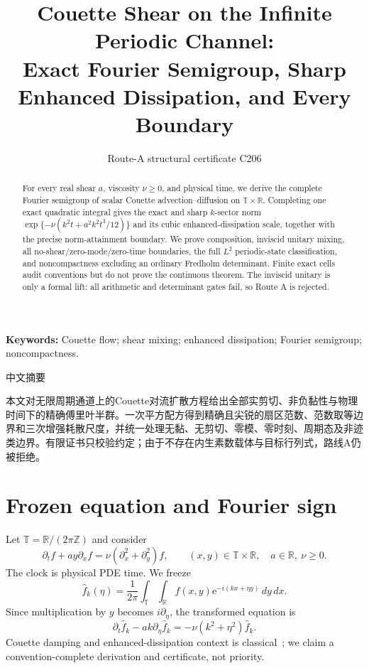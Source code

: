 \documentclass[9pt]{extarticle}
\title{Couette Shear on the Infinite Periodic Channel:\\
Exact Fourier Semigroup, Sharp Enhanced Dissipation, and Every Boundary}
\author{Route-A structural certificate C206}
\date{}
\newcommand{\R}{\mathbb R}
\newcommand{\T}{\mathbb T}
\newcommand{\e}{\mathrm e}
\begin{document}
\maketitle
\begin{abstract}
For every real shear $a$, viscosity $\nu\ge0$, and physical time, we derive
the complete Fourier semigroup of scalar Couette advection--diffusion on
$\T\times\R$.  Completing one exact quadratic integral gives the exact and
sharp $k$-sector norm $\exp\{-\nu(k^2t+a^2k^2t^3/12)\}$ and its cubic
enhanced-dissipation scale, together with the precise norm-attainment
boundary.  We prove composition, inviscid unitary mixing,
all no-shear/zero-mode/zero-time boundaries, the full $L^2$ periodic-state
classification, and noncompactness excluding an ordinary Fredholm
determinant.  Finite exact cells audit conventions but do not prove the
continuous theorem.  The inviscid unitary is only a formal lift: all
arithmetic and determinant gates fail, so Route A is rejected.
\end{abstract}
\noindent\textbf{Keywords:} Couette flow; shear mixing; enhanced dissipation;
Fourier semigroup; noncompactness.

\begin{otherlanguage}{chinese-simplified}
\begin{center}{\large 中文摘要}\end{center}
本文对无限周期通道上的\foreignlanguage{english}{Couette}对流扩散方程给出全部实剪切、非负黏性与物理时间下的精确傅里叶半群。一次平方配方得到精确且尖锐的扇区范数、范数取等边界和三次增强耗散尺度，并统一处理无黏、无剪切、零模、零时刻、周期态及非迹类边界。有限证书只校验约定；由于不存在内生素数载体与目标行列式，路线\foreignlanguage{english}{A}仍被拒绝。
\end{otherlanguage}

\section{Frozen equation and Fourier sign}
Let $\T=\R/(2\pi\mathbb Z)$ and consider
\begin{equation}\label{eq:pde}
 \partial_t f+a y\partial_xf=\nu(\partial_x^2+\partial_y^2)f,
 \qquad (x,y)\in\T\times\R,\quad a\in\R,\ \nu\ge0.
\end{equation}
The clock is physical PDE time.  We freeze
\[
 \widehat f_k(\eta)=\frac1{2\pi}\int_{\T}\int_\R
 f(x,y)\e^{-i(kx+\eta y)}\,dy\,dx.
\]
Since multiplication by $y$ becomes $i\partial_\eta$, the transformed equation is
\begin{equation}\label{eq:fourier}
 \partial_t\widehat f_k-a k\partial_\eta\widehat f_k
 =-\nu(k^2+\eta^2)\widehat f_k.
\end{equation}
Couette damping and enhanced-dissipation context is classical~\cite{BMV}; we
claim a convention-complete derivation and certificate, not priority.
\end{document}
